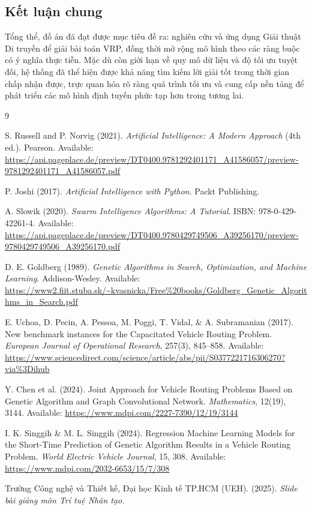 \documentclass[12pt,a4paper]{article}
\numberwithin{figure}{subsection}
\numberwithin{table}{subsection}
\renewcommand{\refname}{Tài liệu tham khảo}
\renewcommand{\listfigurename}{Danh mục hình ảnh}
\renewcommand{\listtablename}{Danh mục bảng biểu}
\begin{document}
\subsection{Kết luận chung}

Tổng thể, đồ án đã đạt được mục tiêu đề ra: nghiên cứu và ứng dụng Giải thuật Di truyền để giải bài toán VRP, đồng thời mở rộng mô hình theo các ràng buộc có ý nghĩa thực tiễn. Mặc dù còn giới hạn về quy mô dữ liệu và độ tối ưu tuyệt đối, hệ thống đã thể hiện được khả năng tìm kiếm lời giải tốt trong thời gian chấp nhận được, trực quan hóa rõ ràng quá trình tối ưu và cung cấp nền tảng để phát triển các mô hình định tuyến phức tạp hơn trong tương lai.
\newpage
{} 

\addcontentsline{toc}{section}{\refname} 
\renewcommand{\refname}{Tài liệu tham khảo}
\renewcommand{\listfigurename}{Danh mục hình ảnh}
\renewcommand{\listtablename}{Danh mục bảng biểu}
\begin{thebibliography}{9}

S. Russell and P. Norvig (2021). \textit{Artificial Intelligence: A Modern Approach} (4th ed.).
Pearson. Available: \url{https://api.pageplace.de/preview/DT0400.9781292401171_A41586057/preview-9781292401171_A41586057.pdf}

P. Joshi (2017). \textit{Artificial Intelligence with Python}.
Packt Publishing.

A. Slowik (2020). \textit{Swarm Intelligence Algorithms: A Tutorial}.
ISBN: 978-0-429-42261-4. Available: \url{https://api.pageplace.de/preview/DT0400.9780429749506_A39256170/preview-9780429749506_A39256170.pdf}

D. E. Goldberg (1989). \textit{Genetic Algorithms in Search, Optimization, and Machine Learning}.
Addison-Wesley. Available: \url{https://www2.fiit.stuba.sk/~kvasnicka/Free%20books/Goldberg_Genetic_Algorithms_in_Search.pdf}

E. Uchoa, D. Pecin, A. Pessoa, M. Poggi, T. Vidal, \& A. Subramanian (2017).
New benchmark instances for the Capacitated Vehicle Routing Problem. \textit{European Journal of Operational Research}, 257(3), 845--858.
Available: \url{https://www.sciencedirect.com/science/article/abs/pii/S0377221716306270?via%3Dihub}

Y. Chen et al. (2024).
Joint Approach for Vehicle Routing Problems Based on Genetic Algorithm
and Graph Convolutional Network. \textit{Mathematics}, 12(19), 3144.
Available: \url{https://www.mdpi.com/2227-7390/12/19/3144}

I. K. Singgih \& M. L. Singgih (2024).
Regression Machine Learning Models for the Short-Time Prediction of
Genetic Algorithm Results in a Vehicle Routing Problem. \textit{World Electric Vehicle Journal}, 15, 308.
Available: \url{https://www.mdpi.com/2032-6653/15/7/308}

Trường Công nghệ và Thiết kế, Đại học Kinh tế TP.HCM (UEH). (2025). \textit{Slide bài giảng môn Trí tuệ Nhân tạo}.

\end{thebibliography}
\end{document}
